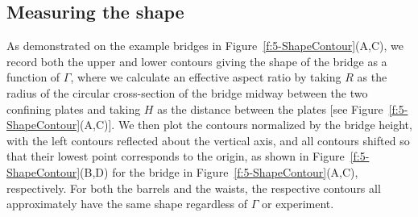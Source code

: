 \subsection{Measuring the shape}
As demonstrated on the example bridges in Figure~\ref{f:5-ShapeContour}(A,C), we record both the upper and lower contours giving the shape of the bridge as a function of $\Gamma$, where we calculate an effective aspect ratio by taking $R$ as the radius of the circular cross-section of the bridge midway between the two confining plates and taking $H$ as the distance between the plates [see Figure~\ref{f:5-ShapeContour}(A,C)].
We then plot the contours normalized by the bridge height, with the left contours reflected about the vertical axis, and all contours shifted so that their lowest point corresponds to the origin, as shown in Figure~\ref{f:5-ShapeContour}(B,D) for the bridge in Figure~\ref{f:5-ShapeContour}(A,C), respectively.
For both the barrels and the waists, the respective contours all approximately have the same shape regardless of $\Gamma$ or experiment.


